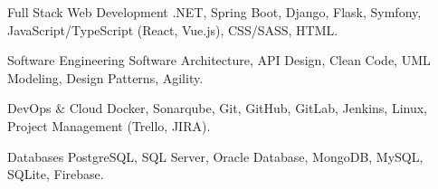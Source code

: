 

\begin{cvskills}

  \cvskill
    {Full Stack Web Development} %
    {.NET, Spring Boot, Django, Flask, Symfony, JavaScript/TypeScript (React, Vue.js), CSS/SASS, HTML.} %

  \cvskill
    {Software Engineering} %
    {Software Architecture, API Design, Clean Code, UML Modeling, Design Patterns, Agility.} %
    
  \cvskill
    {DevOps \& Cloud} %
    {Docker, Sonarqube, Git, GitHub, GitLab, Jenkins, Linux, Project Management (Trello, JIRA).} %

  \cvskill
    {Databases} %
    {PostgreSQL, SQL Server, Oracle Database, MongoDB, MySQL, SQLite, Firebase.} %

\end{cvskills}
